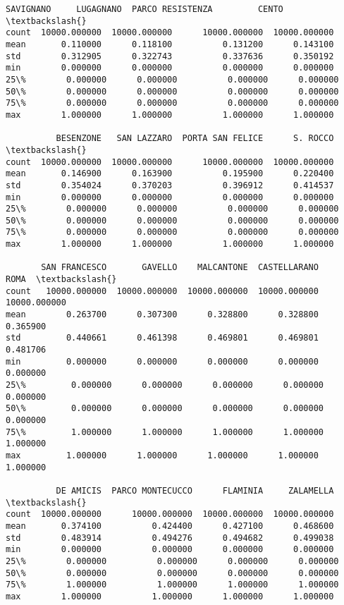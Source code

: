 \documentclass[11pt]{article}
\begin{document}
\begin{tcolorbox}[breakable, size=fbox, boxrule=.5pt, pad at break*=1mm, opacityfill=0]
\begin{Verbatim}[commandchars=\\\{\}]
          SAVIGNANO     LUGAGNANO  PARCO RESISTENZA         CENTO  \textbackslash{}
count  10000.000000  10000.000000      10000.000000  10000.000000
mean       0.110000      0.118100          0.131200      0.143100
std        0.312905      0.322743          0.337636      0.350192
min        0.000000      0.000000          0.000000      0.000000
25\%        0.000000      0.000000          0.000000      0.000000
50\%        0.000000      0.000000          0.000000      0.000000
75\%        0.000000      0.000000          0.000000      0.000000
max        1.000000      1.000000          1.000000      1.000000

          BESENZONE   SAN LAZZARO  PORTA SAN FELICE      S. ROCCO  \textbackslash{}
count  10000.000000  10000.000000      10000.000000  10000.000000
mean       0.146900      0.163900          0.195900      0.220400
std        0.354024      0.370203          0.396912      0.414537
min        0.000000      0.000000          0.000000      0.000000
25\%        0.000000      0.000000          0.000000      0.000000
50\%        0.000000      0.000000          0.000000      0.000000
75\%        0.000000      0.000000          0.000000      0.000000
max        1.000000      1.000000          1.000000      1.000000

       SAN FRANCESCO       GAVELLO    MALCANTONE  CASTELLARANO          ROMA  \textbackslash{}
count   10000.000000  10000.000000  10000.000000  10000.000000  10000.000000
mean        0.263700      0.307300      0.328800      0.328800      0.365900
std         0.440661      0.461398      0.469801      0.469801      0.481706
min         0.000000      0.000000      0.000000      0.000000      0.000000
25\%         0.000000      0.000000      0.000000      0.000000      0.000000
50\%         0.000000      0.000000      0.000000      0.000000      0.000000
75\%         1.000000      1.000000      1.000000      1.000000      1.000000
max         1.000000      1.000000      1.000000      1.000000      1.000000

          DE AMICIS  PARCO MONTECUCCO      FLAMINIA     ZALAMELLA  \textbackslash{}
count  10000.000000      10000.000000  10000.000000  10000.000000
mean       0.374100          0.424400      0.427100      0.468600
std        0.483914          0.494276      0.494682      0.499038
min        0.000000          0.000000      0.000000      0.000000
25\%        0.000000          0.000000      0.000000      0.000000
50\%        0.000000          0.000000      0.000000      0.000000
75\%        1.000000          1.000000      1.000000      1.000000
max        1.000000          1.000000      1.000000      1.000000


\end{Verbatim}
\end{tcolorbox}
\end{document}
